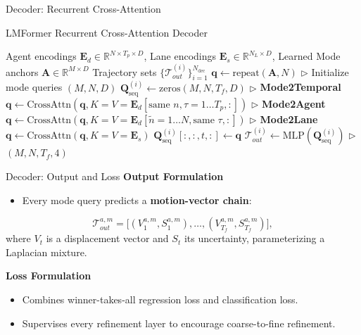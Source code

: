 \documentclass[10pt,aspectratio=169]{beamer}
\begin{document}
\begin{frame}[fragile]{Decoder: Recurrent Cross-Attention}
    \begin{block}{LMFormer Recurrent Cross-Attention Decoder}
    \begin{algorithmic}[1]
    \footnotesize
    \Require Agent encodings \(\mathbf{E}_d \in \mathbb{R}^{N \times T_{p} \times D}\), Lane encodings \(\mathbf{E}_s \in \mathbb{R}^{N_L \times D}\), Learned Mode anchors \(\mathbf{A} \in \mathbb{R}^{M \times D}\)
    \Ensure Trajectory sets \(\{\mathcal{T}_{out}^{(i)}\}_{i=1}^{N_{\text{dec}}}\)
    \State \(\mathbf{q} \leftarrow \text{repeat}(\mathbf{A}, N)\) \(\triangleright\) Initialize mode queries \((M, N, D)\)
        \State \(\mathbf{Q}_{\text{seq}}^{(i)} \leftarrow \text{zeros}(M, N, T_f, D)\)
            \State \(\triangleright\) \textbf{Mode2Temporal}
            \State \(\mathbf{q}\leftarrow \text{CrossAttn}(\mathbf{q}, K=V=\mathbf{E}_d[\text{same } n, \tau=1\dots T_p, :])\)
            \State \(\triangleright\) \textbf{Mode2Agent}
            \State \(\mathbf{q}\leftarrow \text{CrossAttn}(\mathbf{q}, K=V=\mathbf{E}_d[\tilde{n}=1\dots N, \text{same }\tau, :])\)
            \State \(\triangleright\) \textbf{Mode2Lane}
            \State \(\mathbf{q}\leftarrow \text{CrossAttn}(\mathbf{q}, K=V=\mathbf{E}_s)\)
            \State \(\mathbf{Q}_{\text{seq}}^{(i)}[:,:,t,:] \leftarrow \mathbf{q}\)
        \EndFor
        \State \(\mathcal{T}_{out}^{(i)} \leftarrow \text{MLP}(\mathbf{Q}_{\text{seq}}^{(i)})\) \(\triangleright\) \((M, N, T_f, 4)\)
    \EndFor
    \end{algorithmic}
    \end{block}
\end{frame}

\begin{frame}{Decoder: Output and Loss}
    \textbf{Output Formulation}
    \begin{itemize}
        \item Every mode query predicts a \textbf{motion-vector chain}:
    \end{itemize}
    \begin{equation}
    \mathcal{T}_{out}^{a,m} = \bigl[(V_1^{a,m},S_1^{a,m}),\dots,(V_{T_f}^{a,m},S_{T_f}^{a,m})\bigr],
    \end{equation}
    where \(V_t\) is a displacement vector and \(S_t\) its uncertainty, parameterizing a Laplacian mixture.

    \vspace{1em}
    \textbf{Loss Formulation}
    \begin{itemize}
        \item Combines winner-takes-all regression loss and classification loss.
        \item Supervises every refinement layer to encourage coarse-to-fine refinement.
    \end{itemize}
\end{frame}
\end{document}
